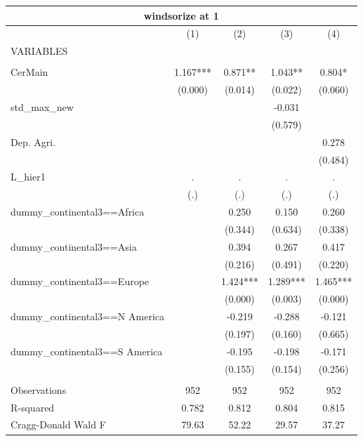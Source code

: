 \begin{tabular}{lcccc}
\multicolumn{5}{c}{windsorize at 1} \\ \hline
 & (1) & (2) & (3) & (4) \\
VARIABLES &  &  &  &  \\ \hline
 &  &  &  &  \\
CerMain & 1.167*** & 0.871** & 1.043** & 0.804* \\
 & (0.000) & (0.014) & (0.022) & (0.060) \\
std\_max\_new &  &  & -0.031 &  \\
 &  &  & (0.579) &  \\
Dep. Agri. &  &  &  & 0.278 \\
 &  &  &  & (0.484) \\
L\_hier1 & . & . & . & . \\
 & (.) & (.) & (.) & (.) \\
dummy\_continental3==Africa &  & 0.250 & 0.150 & 0.260 \\
 &  & (0.344) & (0.634) & (0.338) \\
dummy\_continental3==Asia &  & 0.394 & 0.267 & 0.417 \\
 &  & (0.216) & (0.491) & (0.220) \\
dummy\_continental3==Europe &  & 1.424*** & 1.289*** & 1.465*** \\
 &  & (0.000) & (0.003) & (0.000) \\
dummy\_continental3==N America &  & -0.219 & -0.288 & -0.121 \\
 &  & (0.197) & (0.160) & (0.665) \\
dummy\_continental3==S America &  & -0.195 & -0.198 & -0.171 \\
 &  & (0.155) & (0.154) & (0.256) \\
 &  &  &  &  \\
Observations & 952 & 952 & 952 & 952 \\
R-squared & 0.782 & 0.812 & 0.804 & 0.815 \\
 Cragg-Donald Wald F & 79.63 & 52.22 & 29.57 & 37.27 \\ \hline
\end{tabular}
